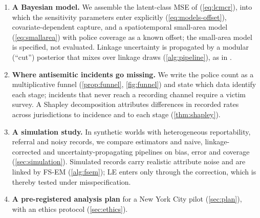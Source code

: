 \begin{enumerate}[label=\textbf{C\arabic*},ref=C\arabic*,leftmargin=2.4em,itemsep=3pt]
  missed matches when they are dense, with a closed-form crossover
  (\cref{cor:link-indep,rem:link-reading}); with three or more strongly
  dependent lists the usual direction can reverse (\cref{rem:link-reversal}).
  We derive the correction implied under LE (\cref{cor:linkcorrect}), a
  total-variance decomposition (\cref{prop:totalvar}), and designs for
  clerical review and a random audit (\cref{thm:review,prop:link-audit}). LE
  has no move for a swap, a record linked to the wrong partner
  (\cref{rem:link-swaps}), and our simulation shows that the correction
  over-corrects when swaps dominate;
  mixing over linkage draws is therefore primary, and the correction a
  diagnostic. Mixing is no substitute for a well-specified linkage model:
  in the simulation, approximate draws from a plug-in linkage posterior did
  not remove the linkage bias either.
  \item\label{contrib:bayes} \textbf{A Bayesian model.} We assemble the
  latent-class MSE of \citet{manriquevallier2016} (\cref{eq:lcmcr}), into
  which the sensitivity parameters enter explicitly (\cref{eq:models-offset}),
  covariate-dependent capture, and a spatiotemporal small-area model
  (\cref{eq:smallarea}) with police coverage as a known offset; the
  small-area model is specified, not evaluated. Linkage uncertainty is
  propagated by a modular (``cut'') posterior that mixes over linkage draws
  (\cref{alg:pipeline}), as in \citet{sadinle2018}.
  \item\label{contrib:funnel} \textbf{Where antisemitic incidents go missing.}
  We write the police count as a multiplicative funnel (\cref{prop:funnel},
  \cref{fig:funnel}) and state which data identify each stage; incidents that
  never reach a recording channel require a victim survey. A Shapley
  decomposition attributes differences in recorded rates across
  jurisdictions to incidence and to each stage (\cref{thm:shapley}).
  \item\label{contrib:sim} \textbf{A simulation study.} In synthetic worlds
  with heterogeneous reportability, referral and noisy records, we compare
  estimators and naive, linkage-corrected and uncertainty-propagating
  pipelines on bias, error and coverage (\cref{sec:simulation}). Simulated records carry
  realistic attribute noise and are linked by FS-EM (\cref{alg:fsem}); LE
  enters only through the correction, which is thereby tested under
  misspecification.
  \item\label{contrib:plan} \textbf{A pre-registered analysis plan} for a
  New York City pilot (\cref{sec:plan}), with an ethics protocol
  (\cref{sec:ethics}).
\end{enumerate}

